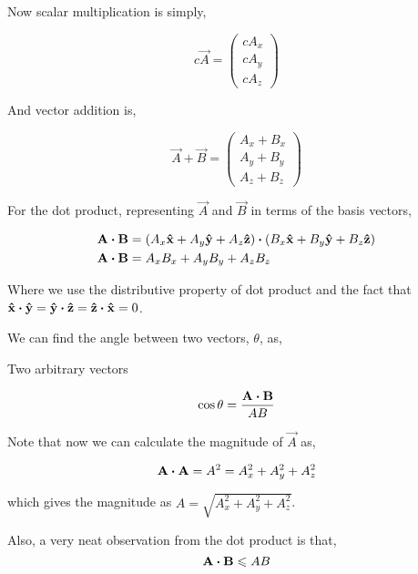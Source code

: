 Now scalar multiplication is simply, 

\[
    c\vec{A} = 
    \begin{pmatrix}
        cA_x \\
        cA_y \\
        cA_z
    \end{pmatrix}
\]

And vector addition is,

\[
    \vec{A} + \vec{B} = 
    \begin{pmatrix}
        A_x + B_x\\
        A_y + B_y\\
        A_z + B_z 
    \end{pmatrix}
\]

For the dot product, representing \(\vec{A}\) and \(\vec{B}\) in terms of the basis vectors,

\begin{align*}
    \vec{A} \dtp \vec{B} &= (A_x \unitv{x} + A_y \unitv{y} + A_z \unitv{z}) \dtp (B_x \unitv{x} + B_y \unitv{y} + B_z \unitv{z}) \\
    \vec{A} \dtp \vec{B} &= A_xB_x + A_yB_y + A_zB_z
\end{align*}

Where we use the distributive property of dot product and the fact 
that \(\unitv{x} \dtp \unitv{y} = \unitv{y} \dtp \unitv{z} = \unitv{z} \dtp \unitv{x} = 0\).

We can find the angle between two vectors, \(\theta\), as,

\begin{marginfigure}
    \centering
    \caption{Two arbitrary vectors}
\end{marginfigure}

\begin{equation*}
    \cos\theta = \frac{\vec{A} \dtp \vec{B}}{AB}
\end{equation*}

Note that now we can calculate the magnitude of \(\vec{A}\) as, 

\begin{equation*}
    \vec{A} \dtp \vec{A} = A^2 = A_x^2 + A_y^2 + A_z^2
\end{equation*}

which gives the magnitude as \(A = \sqrt{A_x^2 + A_y^2 + A_z^2}\).

Also, a very neat observation from the dot product is that,
\begin{equation*}
    \vec{A} \dtp \vec{B} \le AB
\end{equation*}

